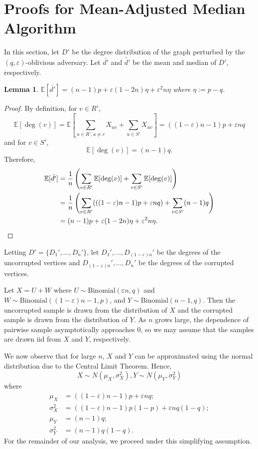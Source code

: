 \documentclass[10pt,onecolumn,letterpaper]{article}
\newtheorem{lem}[thm]{Lemma}
\newcommand{\ee}{\mathbb{E}}
\newcommand{\eps}{\varepsilon}
\begin{document}
\section{Proofs for Mean-Adjusted Median Algorithm} \label{proofs for mean-adjusted median algorithm}
In this section, let $D'$ be the degree distribution of the graph perturbed by the $(q,\eps)$-oblivious adversary. Let $\bar{d'}$ and $\tilde{d'}$ be the mean and median of $D'$, respectively.
\begin{lem} \label{lem: exp bar d'}
$\ee[\bar{d'}] = (n-1)p + \eps(1-2n)\eta + \eps^2n\eta$ where $\eta := p-q$.
\end{lem}
\begin{proof}
By definition, for $v\in R'$, $$\ee[\deg(v)] = \ee\left[\sum_{u\in R', u\neq v}X_{uv} + \sum_{u\in S'}X_{uv}\right] =((1-\eps)n-1)p + \eps nq$$ and for $v\in S'$, $$\ee[\deg(v)] = (n-1)q.$$ Therefore, \begin{align*}
    \ee[\bar{d'}] &=  \frac{1}{n}\left(\sum_{v\in R'}\ee[\deg(v)] + \sum_{v\in S'}\ee[\deg(v)] \right)\\
    &= \frac{1}{n}\left(\sum_{v\in R'}(((1-\eps)n -1)p + \eps nq) + \sum_{v\in S'}(n-1)q \right)\\
    &= (n-1)p + \eps(1-2n)\eta + \eps^2n\eta.\qedhere
\end{align*}
\end{proof}

Letting $D' = \{D_1', \dots, D_n'\}$, let $D_1',\dots, D_{(1-\eps)n}'$ be the degrees of the uncorrupted vertices and $D_{(1-\eps)n}',\dots, D_n'$ be the degrees of the corrupted vertices. 

Let $X = U + W$ where $U \sim \mathrm{Binomial}(\eps n, q)$ and $W\sim\mathrm{Binomial}((1-\eps)n-1, p)$, and $Y\sim\mathrm{Binomial}(n-1, q)$. Then the uncorrupted sample is drawn from the distribution of $X$ and the corrupted sample is drawn from the distribution of $Y$. As $n$ grows large, the dependence of pairwise sample asymptotically approaches 0, so we may assume that the samples are drawn iid from $X$ and $Y$, respectively.

We now observe that for large $n$, $X$ and $Y$ can be approximated using the normal distribution due to the Central Limit Theorem. Hence, $$X\sim N(\mu_X, \sigma_X^2), Y \sim N(\mu_Y, \sigma_Y^2)$$ where \begin{align*}
    \mu_X &= ((1-\eps)n-1)p + \eps nq;\\
    \sigma_X^2 &= ((1-\eps)n-1)p(1-p) + \eps nq(1-q);\\
    \mu_Y &= (n-1)q;\\
    \sigma_Y^2 &= (n-1)q(1-q).
\end{align*} For the remainder of our analysis, we proceed under this simplifying assumption.
\end{document}
